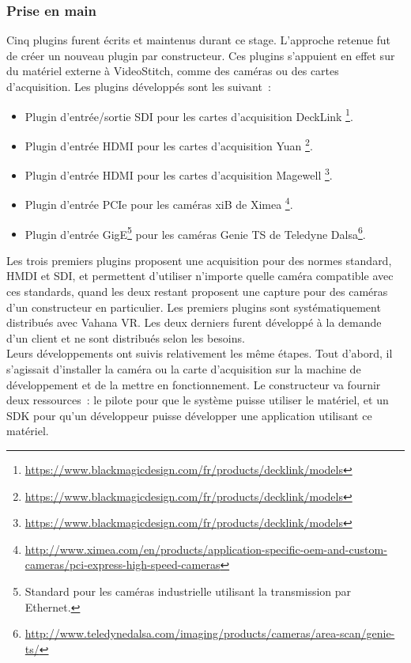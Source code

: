 \subsubsection{Prise en main}
Cinq plugins furent écrits et maintenus durant ce stage. L'approche retenue fut de créer
un nouveau plugin par constructeur. Ces plugins s'appuient en effet sur du matériel
externe à VideoStitch, comme des caméras ou des cartes d'acquisition. Les plugins
développés sont les suivant~:
\begin{itemize}
  \item Plugin d'entrée/sortie SDI pour les cartes d'acquisition DeckLink
  \footnote{\url{https://www.blackmagicdesign.com/fr/products/decklink/models}}.
  \item Plugin d'entrée HDMI pour les cartes d'acquisition Yuan
  \footnote{\url{https://www.blackmagicdesign.com/fr/products/decklink/models}}.
  \item Plugin d'entrée HDMI pour les cartes d'acquisition Magewell
  \footnote{\url{https://www.blackmagicdesign.com/fr/products/decklink/models}}.
  \item Plugin d'entrée PCIe pour les caméras xiB de Ximea
  \footnote{\url{http://www.ximea.com/en/products/application-specific-oem-and-custom-cameras/pci-express-high-speed-cameras}}.
  \item Plugin d'entrée GigE\footnote{Standard pour les caméras industrielle utilisant 
  la transmission par Ethernet\cite{gige}.} pour les caméras Genie TS de Teledyne Dalsa\footnote{\url{http://www.teledynedalsa.com/imaging/products/cameras/area-scan/genie-ts/}}.
\end{itemize}
Les trois premiers plugins proposent une acquisition pour des normes standard, HMDI et SDI, 
et permettent d'utiliser n'importe quelle caméra compatible avec ces standards, quand les
deux restant proposent une capture pour des caméras d'un constructeur en particulier.
Les premiers plugins sont systématiquement distribués avec Vahana VR. Les deux derniers
furent développé à la demande d'un client et ne sont distribués selon les besoins.\\
\newline
Leurs développements ont suivis relativement les même étapes.
Tout d'abord, il s'agissait d'installer la caméra ou la carte d'acquisition sur la 
machine de développement et de la mettre en fonctionnement. Le constructeur va fournir
deux ressources~: le pilote pour que le système puisse utiliser le matériel, et un
SDK pour qu'un développeur puisse développer une application utilisant ce matériel.
